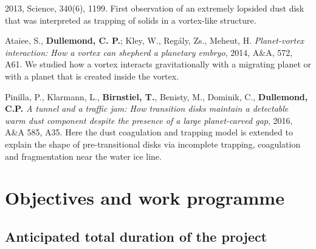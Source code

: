 \documentclass[10pt,fleqn,twoside]{article}
\begin{document}
\begin{literature}
  2013, Science, 340(6), 1199. First observation of an extremely
  lopsided dust disk that was interpreted as trapping of solids in a
  vortex-like structure.
\item Ataiee, S., \textbf{Dullemond, C. P.}; Kley, W., Regály, Zs.,
  Meheut, H. \textit{Planet-vortex interaction: How a vortex can
  shepherd a planetary embryo}, 2014, A\&A, 572, A61. We studied how a
  vortex interacts gravitationally with a migrating planet or with a
  planet that is created inside the vortex.
\item Pinilla, P., Klarmann, L., \textbf{Birnstiel, T.}, Benisty, M.,
  Dominik, C., \textbf{Dullemond, C.P.} {\em A tunnel and a traffic
  jam: How transition disks maintain a detectable warm dust component
  despite the presence of a large planet-carved gap}, 2016, A\&A 585,
  A35. Here the dust coagulation and trapping model is extended to
  explain the shape of pre-transitional disks via incomplete trapping,
  coagulation and fragmentation near the water ice line.
\end{literature}

% 
% 
% 
% 
% 
% 
% 
% 

\section{Objectives and work programme}


\subsection{Anticipated total duration of the project}
\end{document}
